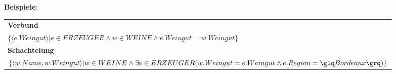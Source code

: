 \documentclass{scrartcl}
\newcommand{\key}[1]{{\textcolor{blue}{\textbf{#1}}}}
\begin{document}
\textbf{Beispiele}:
\vspace{1em}
 \\
\begin{tabular}{p{\textwidth}}
	\textbf{Verbund} \\
	$\{\langle e.Weingut \rangle | e \in ERZEUGER \wedge w \in WEINE \wedge e.Weingut = w.Weingut\}$\\
	\textbf{Schachtelung} \\
	$\{\langle w.Name, w.Weingut \rangle | w \in WEINE \wedge \exists e \in ERZEUGER(w.Weingut = e.Weingut \wedge e.Region = \glq Bordeaux \grq)\}$
\end{tabular}


%
\end{document}
